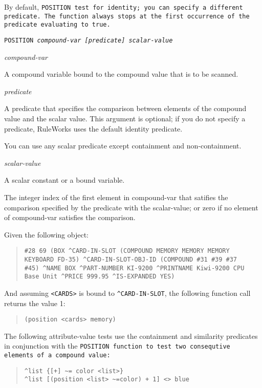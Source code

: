 {{By default, \tt{POSITION} test for identity; you can specify a
different predicate. The function always stops at the first occurrence
of the predicate evaluating to true.

\Format

\tt{POSITION} \it{compound-var} [\it{predicate}] \it{scalar-value}

\Arguments

\it{compound-var}

A compound variable bound to the compound value that is to be
scanned.

\it{predicate}

A predicate that specifies the comparison between elements of
the compound value and the scalar value. This argument is
optional; if you do not specify a predicate, RuleWorks uses
the default identity predicate.

You can use any scalar predicate except containment and
non-containment.

\it{scalar-value}

A scalar constant or a bound variable.

\ReturnValue

The integer index of the first element in compound-var that
satifies the comparison specified by the predicate with the
scalar-value; or zero if no element of compound-var satisfies
the comparison.

\Example

Given the following object:
\begin{quote}
\begin{verbatim}
#28 69 (BOX ^CARD-IN-SLOT (COMPOUND MEMORY MEMORY MEMORY
KEYBOARD FD-35) ^CARD-IN-SLOT-OBJ-ID (COMPOUND #31 #39 #37
#45) ^NAME BOX ^PART-NUMBER KI-9200 ^PRINTNAME Kiwi-9200 CPU
Base Unit ^PRICE 999.95 ^IS-EXPANDED YES)
\end{verbatim}
\end{quote}
And assuming \verb|<CARDS>| is bound to \verb|^CARD-IN-SLOT|, the following
function call returns the value 1:
\begin{quote}
\begin{verbatim}
(position <cards> memory)
\end{verbatim}
\end{quote}

The following attribute-value tests use the containment and
similarity predicates in conjunction with the \tt{POSITION}
function to test two consequtive elements of a compound
value:
\begin{quote}
\begin{verbatim}
^list {[+] ~= color <list>}
^list [(position <list> ~=color) + 1] <> blue
\end{verbatim}
\end{quote}


}}
